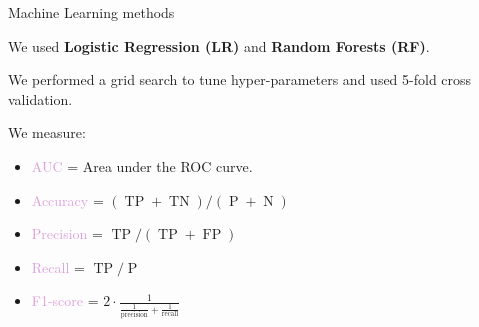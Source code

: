 \documentclass[usenames,dvipsnames]{beamer}
\newcommand{\TP}{\operatorname{TP}}
\newcommand{\TN}{\operatorname{TN}}
\newcommand{\FP}{\operatorname{FP}}
\begin{document}
\begin{frame}{Machine Learning methods}

We used \textbf{Logistic Regression (LR)} and \textbf{Random Forests (RF)}. 
\medskip

We performed a grid search to tune hyper-parameters and used 5-fold cross validation.  
\medskip

We measure:
\begin{itemize}
\item \textcolor{Plum}{AUC} = Area under the ROC curve.
\item \textcolor{Plum}{Accuracy} = $(\TP + \TN) / (\operatorname{P} + \operatorname{N})$
\item \textcolor{Plum}{Precision} = $\TP / (\TP + \FP)$
\item \textcolor{Plum}{Recall} = $\TP / \operatorname{P}$
\item \textcolor{Plum}{F1-score} = 
	$ 2 \cdot \frac{1}{ \frac{1}{\mbox{precision}} + \frac{1}{\mbox{recall}} } $
\end{itemize}

\end{frame}
\end{document}
